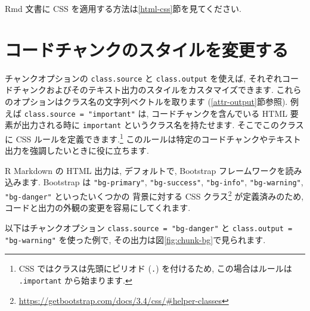 \documentclass[
  11pt,
  lualatex,
  ja=standard]{bxjsreport}
\renewcommand{\href}[2]{#2\footnote{\url{#1}}}
\begin{document}
Rmd 文書に CSS を適用する方法は\ref{html-css}節を見てください.

\hypertarget{chunk-styling}{%
\section{コードチャンクのスタイルを変更する}\label{chunk-styling}}

チャンクオプションの \texttt{class.source} と \texttt{class.output} を使えば, それぞれコードチャンクおよびそのテキスト出力のスタイルをカスタマイズできます. これらのオプションはクラス名の文字列ベクトルを取ります (\ref{attr-output}節参照). 例えば \texttt{class.source = "important"} は, コードチャンクを含んでいる HTML 要素が出力される時に \texttt{important} というクラス名を持たせます. そこでこのクラスに CSS ルールを定義できます.\footnote{CSS ではクラスは先頭にピリオド (\texttt{.}) を付けるため, この場合はルールは \texttt{.important} から始まります.} このルールは特定のコードチャンクやテキスト出力を強調したいときに役に立ちます.

R Markdown の HTML 出力は, デフォルトで, Bootstrap フレームワークを読み込みます. Bootstrap は \texttt{"bg-primary"}, \texttt{"bg-success"}, \texttt{"bg-info"}, \texttt{"bg-warning"}, \texttt{"bg-danger"} といったいくつかの \href{https://getbootstrap.com/docs/3.4/css/\#helper-classes}{背景に対する CSS クラス} が定義済みのため, コードと出力の外観の変更を容易にしてくれます.

以下はチャンクオプション \texttt{class.source = "bg-danger"} と \texttt{class.output = "bg-warning"} を使った例で, その出力は図\ref{fig:chunk-bg}で見られます.
\end{document}
